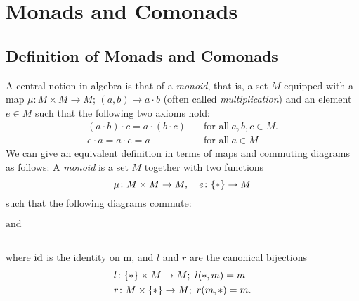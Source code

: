 \chapter{Monads and Comonads}
\section{Definition of Monads and Comonads}
A central notion in algebra is that of a \textit{monoid},
that is, a set $M$ equipped with a map 
$\mu \colon M \times M \to M$; $(a,b) \mapsto a \cdot b$ 
(often called \textit{multiplication}) and an element $e \in M$
such that the following two axioms hold:
\begin{align}
    \label{eq: associativity for a monoid}  \tag{associativity} 
    (a \cdot b) \cdot c = a \cdot (b \cdot c) 
    \quad &\text{for all} \ a,b,c \in M. \\
    \label{eq: identity element for a monoid} \tag{identity element}
    e \cdot a = a \cdot e = a \quad &\text{for all} \ a \in M 
\end{align}
We can give an equivalent definition in terms of maps and commuting diagrams as follows:
A \textit{monoid} is a set $M$ together with two functions 
\[
    \mu \colon M \times M \to M, \quad 
    e \colon \{\ast\} \to M
\]
such that the following diagrams commute: \\

\begin{minipage}{0.4\linewidth}
    \centering
    \end{minipage}
    $\mathrm{and}$
    \begin{minipage}{0.4\linewidth}
    \centering
    \end{minipage} \\
    where $\operatorname{id}$ is the identity on m, and $l$ and $r$ are the canonical bijections
    \begin{align*}
        &l \colon \{\ast\} \times M \to M;\ l(\ast,m) = m \\
        &r \colon M \times \{\ast\} \to M;\ r(m,\ast) = m.
    \end{align*}

